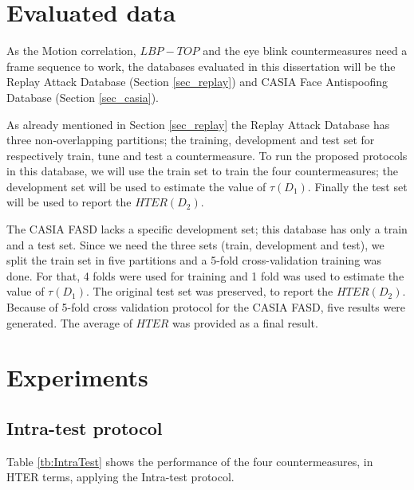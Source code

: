 \section{Evaluated data}
\label{sec:data}

As the Motion correlation, $LBP-TOP$ and the eye blink countermeasures need a frame sequence to work, the databases evaluated in this dissertation will be the Replay Attack Database (Section \ref{sec_replay}) and CASIA Face Antispoofing Database (Section \ref{sec_casia}).

As already mentioned in Section \ref{sec_replay} the Replay Attack Database has three non-overlapping partitions; the training, development and test set for respectively train, tune and test a countermeasure. To run the proposed protocols in this database, we will use the train set to train the four countermeasures; the development set will be used to estimate the value of $\tau(D_1)$. Finally the test set will be used to report the $HTER(D_2)$.

The CASIA FASD lacks a specific development set; this database has only a train and a test set. Since we need the three sets (train, development and test), we split the train set in five partitions and a 5-fold cross-validation training was done. For that, 4 folds were used for training and 1 fold was used to estimate the value of $\tau(D_1)$. The original test set was preserved, to report the $HTER(D_2)$. Because of 5-fold cross validation protocol for the CASIA FASD, five results were generated. The average of $HTER$ was provided as a final result.






\section{Experiments}
\label{sec:Comparative_experiments}

\subsection{Intra-test protocol}
\label{sec:Intra_test}

Table \ref{tb:IntraTest} shows the performance of the four countermeasures, in HTER terms, applying the Intra-test protocol.


